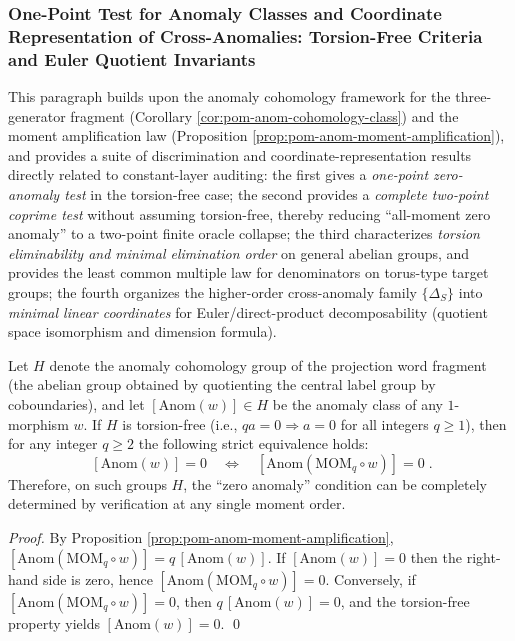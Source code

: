 \subsubsection{One-Point Test for Anomaly Classes and Coordinate Representation of Cross-Anomalies: Torsion-Free Criteria and Euler Quotient Invariants}\label{subsubsec:pom-anom-torsionfree-euler-quotient}
This paragraph builds upon the anomaly cohomology framework for the three-generator fragment (Corollary \ref{cor:pom-anom-cohomology-class}) and the moment amplification law (Proposition \ref{prop:pom-anom-moment-amplification}),
and provides a suite of discrimination and coordinate-representation results directly related to constant-layer auditing:
the first gives a \emph{one-point zero-anomaly test} in the torsion-free case;
the second provides a \emph{complete two-point coprime test} without assuming torsion-free, thereby reducing ``all-moment zero anomaly'' to a two-point finite oracle collapse;
the third characterizes \emph{torsion eliminability and minimal elimination order} on general abelian groups, and provides the least common multiple law for denominators on torus-type target groups;
the fourth organizes the higher-order cross-anomaly family \(\{\Delta_S\}\) into \emph{minimal linear coordinates} for Euler/direct-product decomposability (quotient space isomorphism and dimension formula).

\begin{corollary}\label{cor:pom-anom-one-point-zero-test}
Let \(H\) denote the anomaly cohomology group of the projection word fragment (the abelian group obtained by quotienting the central label group by coboundaries), and let \([\mathrm{Anom}(w)]\in H\) be the anomaly class of any \(1\)-morphism \(w\).
If \(H\) is torsion-free (i.e., \(qa=0\Rightarrow a=0\) for all integers \(q\ge 1\)), then for any integer \(q\ge 2\) the following strict equivalence holds:
\[
\boxed{\;
[\mathrm{Anom}(w)]=0\quad\Longleftrightarrow\quad [\mathrm{Anom}(\mathrm{MOM}_q\circ w)]=0\; }.
\]
Therefore, on such groups \(H\), the ``zero anomaly'' condition can be completely determined by verification at any single moment order.
\end{corollary}
\begin{proof}
By Proposition \ref{prop:pom-anom-moment-amplification},
\(
[\mathrm{Anom}(\mathrm{MOM}_q\circ w)]=q\,[\mathrm{Anom}(w)]
\).
If \([\mathrm{Anom}(w)]=0\) then the right-hand side is zero, hence \([\mathrm{Anom}(\mathrm{MOM}_q\circ w)]=0\).
Conversely, if \([\mathrm{Anom}(\mathrm{MOM}_q\circ w)]=0\), then \(q\,[\mathrm{Anom}(w)]=0\), and the torsion-free property yields \([\mathrm{Anom}(w)]=0\). \qed
\end{proof}

